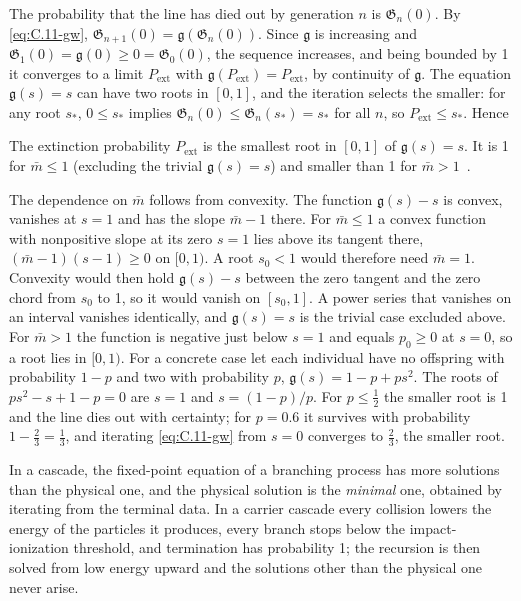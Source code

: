 The probability that the line has died out by generation $n$ is $\mathfrak{G}_n(0)$. By \cref{eq:C.11-gw}, $\mathfrak{G}_{n+1}(0) = \mathfrak{g}(\mathfrak{G}_n(0))$. Since $\mathfrak{g}$ is increasing and $\mathfrak{G}_1(0) = \mathfrak{g}(0) \ge 0 = \mathfrak{G}_0(0)$, the sequence increases, and being bounded by 1 it converges to a limit $P_{\mathrm{ext}}$ with $\mathfrak{g}(P_{\mathrm{ext}}) = P_{\mathrm{ext}}$, by continuity of $\mathfrak{g}$. The equation $\mathfrak{g}(s) = s$ can have two roots in $[0, 1]$, and the iteration selects the smaller: for any root $s_*$, $0 \le s_*$ implies $\mathfrak{G}_n(0) \le \mathfrak{G}_n(s_*) = s_*$ for all $n$, so $P_{\mathrm{ext}} \le s_*$. Hence
\begin{keyresult}
The extinction probability $P_{\mathrm{ext}}$ is the smallest root in $[0, 1]$ of $\mathfrak{g}(s) = s$. It is 1 for $\bar m \le 1$ (excluding the trivial $\mathfrak{g}(s) = s$) and smaller than 1 for $\bar m > 1$~\cite[Chap.~I]{harris1963theory}.
\end{keyresult}
The dependence on $\bar m$ follows from convexity. The function $\mathfrak{g}(s) - s$ is convex, vanishes at $s = 1$ and has the slope $\bar m - 1$ there. For $\bar m \le 1$ a convex function with nonpositive slope at its zero $s = 1$ lies above its tangent there, $(\bar m - 1)(s - 1) \ge 0$ on $[0, 1)$. A root $s_0 < 1$ would therefore need $\bar m = 1$. Convexity would then hold $\mathfrak{g}(s) - s$ between the zero tangent and the zero chord from $s_0$ to 1, so it would vanish on $[s_0, 1]$. A power series that vanishes on an interval vanishes identically, and $\mathfrak{g}(s) = s$ is the trivial case excluded above. For $\bar m > 1$ the function is negative just below $s = 1$ and equals $p_0 \ge 0$ at $s = 0$, so a root lies in $[0, 1)$. For a concrete case let each individual have no offspring with probability $1 - p$ and two with probability $p$, $\mathfrak{g}(s) = 1 - p + ps^2$. The roots of $ps^2 - s + 1 - p = 0$ are $s = 1$ and $s = (1 - p)/p$. For $p \le \tfrac12$ the smaller root is 1 and the line dies out with certainty; for $p = 0.6$ it survives with probability $1 - \tfrac23 = \tfrac13$, and iterating \cref{eq:C.11-gw} from $s = 0$ converges to $\tfrac23$, the smaller root.

In a cascade, the fixed-point equation of a branching process has more solutions than the physical one, and the physical solution is the \emph{minimal} one, obtained by iterating from the terminal data. In a carrier cascade every collision lowers the energy of the particles it produces, every branch stops below the impact-ionization threshold, and termination has probability 1; the recursion is then solved from low energy upward and the solutions other than the physical one never arise.

